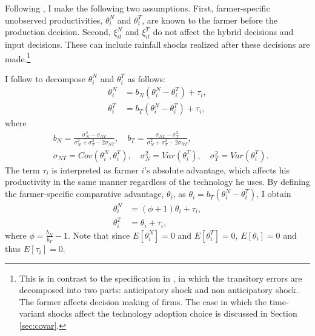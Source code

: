 \documentclass[11pt,letterpaper]{article}
\begin{document}
Following \citet{Suri11}, I make the following two assumptions.
First, farmer-specific unobserved productivities, $\theta_i^N$ and $\theta_i^T$, are known to the farmer before the production decision.
Second, $\xi_{it}^N$ and $\xi_{it}^T$ do not affect the hybrid decisions and input decisions.
These can include rainfall shocks realized after these decisions are made.\footnote{
  This is in contrast to the specification in \citet{OP96}, in which the transitory errors are decomposed into two parts: anticipatory shock and non anticipatory shock.
  The former affects decision making of firms.
  The case in which the time-variant shocks affect the technology adoption choice is discussed in Section \ref{sec:covar}.
}

I follow \citet{Lemieux98} to decompose  $\theta_i^N$ and $\theta_i^T$ as follows:
\begin{align*}
  \theta_i^N &= b_N (\theta_i^N - \theta_i^T) + \tau_i, \\
  \theta_i^T &= b_T (\theta_i^N - \theta_i^T) + \tau_i,
\end{align*}
where
\begin{align*}
  &b_N = \frac{\sigma_N^2 - \sigma_{NT}}{\sigma_N^2 + \sigma_T^2 - 2 \sigma_{NT}},\quad b_T = \frac{\sigma_{NT} - \sigma_T^2}{\sigma_N^2 + \sigma_T^2 - 2 \sigma_{NT}}, \\
  &\sigma_{NT} = Cov(\theta_i^N, \theta_i^T),\quad \sigma_N^2 = Var(\theta_i^T),\quad \sigma_T^2 = Var(\theta_i^T).
\end{align*}
The term $\tau_i$ is interpreted as farmer $i$'s absolute advantage, which affects his productivity in the same manner regardless of the technology he uses.
By defining the farmer-specific comparative advantage, $\theta_i$, as $\theta_i = b_T (\theta_i^N - \theta_i^T)$, I obtain
\begin{align*}
  \theta_i^N &= (\phi + 1) \theta_i + \tau_i, \\
  \theta_i^T &= \theta_i + \tau_i,
\end{align*}
where $\phi = \frac{b_N}{b_T} - 1$.
Note that since $E[\theta_i^N] = 0$ and $E[\theta_i^T] = 0$, $E[\theta_i] = 0$ and thus $E[\tau_i] = 0$.
\end{document}
